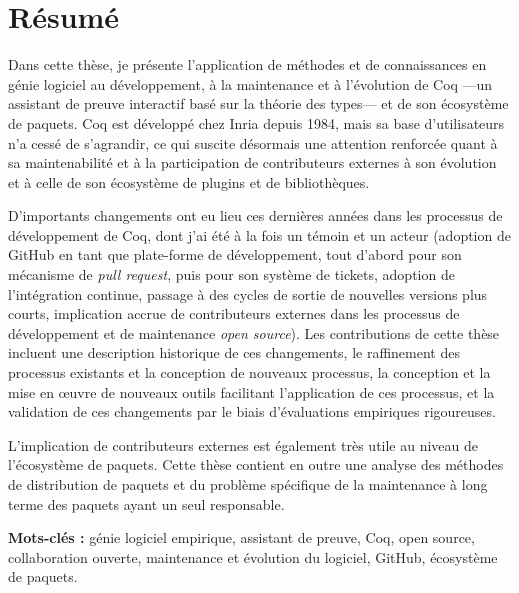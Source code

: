     
\begin{minipage}[b][0.49\textheight][t]{\textwidth}

\section*{R\'esum\'e}
\begin{SingleSpace}

Dans cette th\`ese, je pr\'esente l'application de m\'ethodes et de connaissances en g\'enie logiciel au d\'eveloppement, \`a la maintenance et \`a l'\'evolution de Coq ---un assistant de preuve interactif bas\'e sur la th\'eorie des types--- et de son \'ecosyst\`eme de paquets.
Coq est d\'evelopp\'e chez Inria depuis 1984, mais sa base d'utilisateurs n'a cess\'e de s'agrandir, ce qui suscite d\'esormais une attention renforc\'ee quant \`a sa maintenabilit\'e et \`a la participation de contributeurs externes \`a son \'evolution et \`a celle de son \'ecosyst\`eme de plugins et de biblioth\`eques.

D'importants changements ont eu lieu ces derni\`eres ann\'ees dans les processus de d\'eveloppement de Coq, dont j'ai \'et\'e à la fois un t\'emoin et un acteur (adoption de GitHub en tant que plate-forme de d\'eveloppement, tout d'abord pour son m\'ecanisme de \emph{pull request}, puis pour son syst\`eme de tickets, adoption de l'intégration continue, passage \`a des cycles de sortie de nouvelles versions plus courts, implication accrue de contributeurs externes dans les processus de d\'eveloppement et de maintenance \emph{open source}).
Les contributions de cette th\`ese incluent une description historique de ces changements, le raffinement des processus existants et la conception de nouveaux processus, la conception et la mise en {\oe}uvre de nouveaux outils facilitant l'application de ces processus, et la validation de ces changements par le biais d'\'evaluations empiriques rigoureuses.

L'implication de contributeurs externes est \'egalement tr\`es utile au niveau de l'\'ecosyst\`eme de paquets.
Cette th\`ese contient en outre une analyse des m\'ethodes de distribution de paquets et du probl\`eme sp\'ecifique de la maintenance \`a long terme des paquets ayant un seul responsable.

\vspace{3mm}

\textbf{Mots-cl\'es :} g\'enie logiciel empirique, assistant de preuve, Coq, open source, collaboration ouverte, maintenance et \'evolution du logiciel, GitHub, \'ecosyst\`eme de paquets.

\end{SingleSpace}
\end{minipage}

